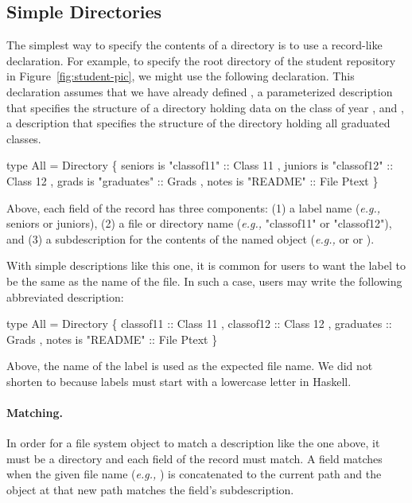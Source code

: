 \subsection{Simple Directories}
\label{sec:simple-directories}

The simplest way to specify the contents of a directory is to use
a record-like declaration.  For example, to specify the root directory
of the student repository in Figure~\ref{fig:student-pic}, we might use
the following declaration.  This declaration assumes that we have already
defined , a parameterized description that specifies
the structure of a directory holding data on the class of year ,
and , a description that specifies the structure of the directory holding
all graduated classes.   
\begin{code}
type All = Directory
  \{ seniors is "classof11" :: Class 11
  , juniors is "classof12" :: Class 12
  , grads is "graduates" :: Grads
  , notes is "README" :: File Ptext
  \}
\end{code}
Above, each field of the record has three components:  (1) a label
name ({\it e.g.,} seniors or juniors), (2) a file or directory name
({\it e.g.,} "classof11" or "classof12"), and (3) a \forest{} subdescription
for the contents of the named object ({\it e.g.,}  or 
or ).

With simple descriptions like this one, it is common for users to want
the label to be the same as the name of the file.  In such a case, users
may write the following abbreviated description:
\begin{code}
type All = Directory
  \{ classof11 :: Class 11
  , classof12 :: Class 12
  , graduates :: Grads
  , notes is "README" :: File Ptext
  \}
\end{code}
Above, the name of the label is used as the expected file name.  We did not
shorten  to  because labels must start
with a lowercase letter in Haskell.

\paragraph*{Matching.}
In order for a file system object to match a description like the one above, it must be a
directory and each field of the record must match.  A field matches when the given
file name ({\em e.g.,} ) is concatenated to the current path and the 
object at that new path matches the field's subdescription.


